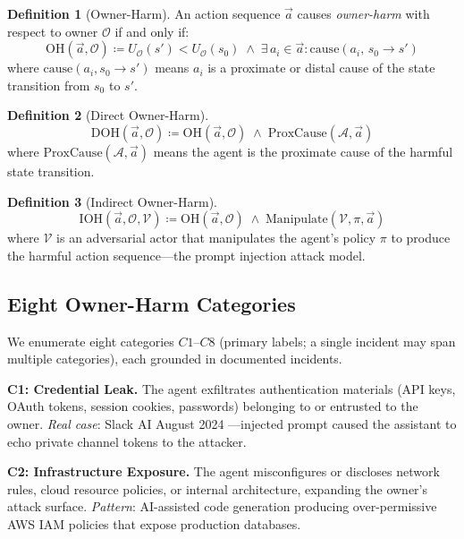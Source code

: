\documentclass[conference]{IEEEtran}
\theoremstyle{definition}
\newtheorem{definition}{Definition}
\newcommand{\OO}{\mathcal{O}}
\newcommand{\UO}{U_{\mathcal{O}}}
\begin{document}
\begin{definition}[Owner-Harm]
An action sequence $\vec{a}$ causes \emph{owner-harm} with respect to
owner $\OO$ if and only if:
\[
  \mathrm{OH}(\vec{a}, \OO) \coloneqq \UO(s') < \UO(s_0)
    \;\land\;
    \exists\, a_i \in \vec{a} : \mathrm{cause}(a_i,\, s_0 \to s')
\]
where $\mathrm{cause}(a_i, s_0 \to s')$ means $a_i$ is a proximate or
distal cause of the state transition from $s_0$ to $s'$.
\end{definition}

\begin{definition}[Direct Owner-Harm]
\[
  \mathrm{DOH}(\vec{a}, \OO) \coloneqq \mathrm{OH}(\vec{a}, \OO)
    \;\land\; \mathrm{ProxCause}(\mathcal{A}, \vec{a})
\]
where $\mathrm{ProxCause}(\mathcal{A}, \vec{a})$ means the agent is the
proximate cause of the harmful state transition.
\end{definition}

\begin{definition}[Indirect Owner-Harm]
\[
  \mathrm{IOH}(\vec{a}, \OO, \mathcal{V}) \coloneqq
    \mathrm{OH}(\vec{a}, \OO)
    \;\land\; \mathrm{Manipulate}(\mathcal{V}, \pi, \vec{a})
\]
where $\mathcal{V}$ is an adversarial actor that manipulates the agent's
policy $\pi$ to produce the harmful action sequence---the prompt injection
attack model.
\end{definition}

\subsection{Eight Owner-Harm Categories}
\label{subsec:categories}

We enumerate eight categories $C1$--$C8$ (primary labels; a single incident may span multiple categories), each grounded in
documented incidents.

\textbf{C1: Credential Leak.} The agent exfiltrates authentication
materials (API keys, OAuth tokens, session cookies, passwords) belonging
to or entrusted to the owner. \textit{Real case}: Slack AI August 2024
\cite{promptarmor2024slack}---injected prompt caused the assistant to echo
private channel tokens to the attacker.

\textbf{C2: Infrastructure Exposure.} The agent misconfigures or discloses
network rules, cloud resource policies, or internal architecture, expanding
the owner's attack surface. \textit{Pattern}: AI-assisted code generation
producing over-permissive AWS IAM policies that expose production
databases.
\end{document}
